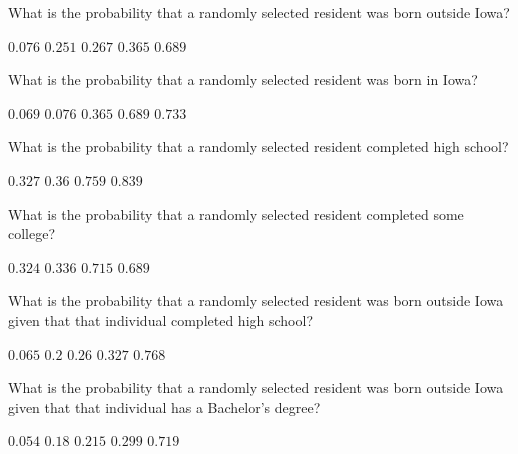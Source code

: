 \documentclass[answers,12pt]{exam}
\begin{document}
\begin{questions}

\question What is the probability that a randomly selected
resident was born outside Iowa?\\
\begin{oneparchoices}
\choice $0.076$ %
\correctchoice $0.251$
\choice $0.267$ %
\choice $0.365$ %
\choice $0.689$ %
\end{oneparchoices}

\question What is the probability that a randomly selected
resident was born in Iowa?\\
\begin{oneparchoices}
\choice $0.069$ %
\choice $0.076$ %
\choice $0.365$ %
\correctchoice $0.689$
\choice $0.733$ %
\end{oneparchoices}

\question What is the probability that a randomly selected
resident completed high school?\\
\begin{oneparchoices}
\correctchoice $0.327$
\choice $0.36$ %
\choice $0.759$ %
\choice $0.839$ %
\end{oneparchoices}

\question What is the probability that a randomly selected
resident completed some college?\\
\begin{oneparchoices}
\correctchoice $0.324$
\choice $0.336$ %
\choice $0.715$ %
\choice $0.689$ %
\end{oneparchoices}

\question What is the probability that a randomly selected
resident was born outside Iowa given that
that individual completed high school?\\
\begin{oneparchoices}
\choice $0.065$ %
\correctchoice $0.2$
\choice $0.26$ %
\choice $0.327$ %
\choice $0.768$ %
\end{oneparchoices}

\question What is the probability that a randomly selected
resident was born outside Iowa given that
that individual has a Bachelor's degree?\\
\begin{oneparchoices}
\choice $0.054$ %
\choice $0.18$ %
\choice $0.215$ %
\correctchoice $0.299$
\choice $0.719$ %
\end{oneparchoices}


\end{questions}
\end{document}

